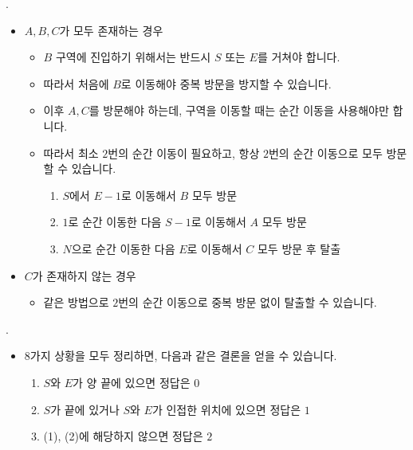 \begin{frame}{\probno{}. \probtitle{}}
    \begin{itemize}
        \item $A, B, C$가 모두 존재하는 경우
        \begin{itemize}
            \item $B$ 구역에 진입하기 위해서는 반드시 $S$ 또는 $E$를 거쳐야 합니다.
            \item 따라서 처음에 $B$로 이동해야 중복 방문을 방지할 수 있습니다.
            \item 이후 $A, C$를 방문해야 하는데, 구역을 이동할 때는 순간 이동을 사용해야만 합니다.
            \item 따라서 최소 $2$번의 순간 이동이 필요하고, 항상 $2$번의 순간 이동으로 모두 방문할 수 있습니다.
            
            \begin{enumerate}
                \item $S$에서 $E-1$로 이동해서 $B$ 모두 방문
                \item $1$로 순간 이동한 다음 $S-1$로 이동해서 $A$ 모두 방문
                \item $N$으로 순간 이동한 다음 $E$로 이동해서 $C$ 모두 방문 후 탈출
            \end{enumerate}
            
        \end{itemize}
        \vspace{2mm}
        \item $C$가 존재하지 않는 경우
        \begin{itemize}
            \item 같은 방법으로 $2$번의 순간 이동으로 중복 방문 없이 탈출할 수 있습니다.
        \end{itemize}
    \end{itemize}
\end{frame}

\begin{frame}{\probno{}. \probtitle{}}
    \begin{itemize}
        \item 8가지 상황을 모두 정리하면, 다음과 같은 결론을 얻을 수 있습니다.
        \begin{enumerate}
            \item $S$와 $E$가 양 끝에 있으면 정답은 $0$
            \item $S$가 끝에 있거나 $S$와 $E$가 인접한 위치에 있으면 정답은 $1$
            \item (1), (2)에 해당하지 않으면 정답은 $2$
        \end{enumerate}
    \end{itemize}
\end{frame}